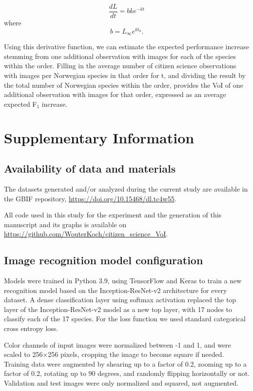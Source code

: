 \documentclass{article}
\begin{document}
\[ \frac{dL}{dt} = bke^{-kt} \]
where
\[ b = L_\infty e^{kt_0}. \]

Using this derivative function, we can estimate the expected performance increase stemming from one additional observation with images for each of the species within the order. Filling in the average number of citizen science observations with images per Norwegian species in that order for t, and dividing the result by the total number of Norwegian species within the order, provides the VoI of one additional observation with images for that order, expressed as an average expected F\(_1\) increase.

\printbibliography
\newpage

\section*{Supplementary Information}
\subsection*{Availability of data and materials}
The datasets generated and/or analyzed during the current study are available in the GBIF repository, \url{https://doi.org/10.15468/dl.tc4w55}.

All code used in this study for the experiment and the generation of this manuscript and its graphs is available on \url{https://github.com/WouterKoch/citizen_science_VoI}.


\subsection*{Image recognition model configuration}
\label{sec:model}
Models were trained in Python 3.9\autocite{python}, using TensorFlow\autocite{tensorflow} and Keras\autocite{keras} to train a new recognition model based on the Inception-ResNet-v2 architecture\autocite{szegedy2016inceptionv4} for every dataset. A dense classification layer using softmax activation replaced the top layer of the Inception-ResNet-v2 model as a new top layer, with 17 nodes to classify each of the 17 species. For the loss function we used standard categorical cross entropy loss.

Color channels of input images were normalized between -1 and 1, and were scaled to 256\(\times\)256 pixels, cropping the image to become square if needed. Training data were augmented by shearing up to a factor of 0.2, zooming up to a factor of 0.2, rotating up to 90 degrees, and randomly flipping horizontally or not. Validation and test images were only normalized and squared, not augmented.
\end{document}
